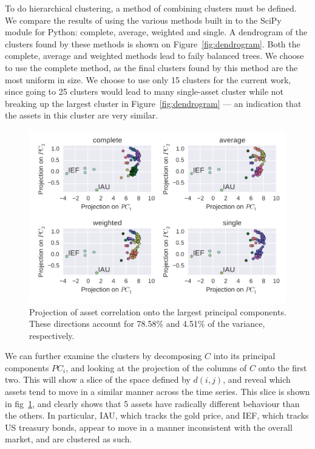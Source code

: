 To do hierarchical clustering, a method of combining clusters must be defined.
We compare the results of using the various methods built in to the SciPy module for Python: complete, average, weighted and single.
A dendrogram of the clusters found by these methods is shown on Figure~\ref{fig:dendrogram}.
Both the complete, average and weighted methods lead to faily balanced trees.
We choose to use the complete method, as the final clusters found by this method are the most uniform in size.
We choose to use only 15 clusters for the current work, since going to 25 clusters would lead to many single-asset cluster while not breaking up the largest cluster in Figure~\ref{fig:dendrogram} --- an indication that the assets in this cluster are very similar.

\begin{figure}[tp]
\centering
\includegraphics{../pic/pca_methods.pdf}
\caption{Projection of asset correlation onto the largest principal components. These directions account for 78.58\% and 4.51\% of the variance, respectively.}
\label{fig:pca}
\end{figure}

We can further examine the clusters by decomposing $C$ into its principal components $PC_i$, and looking at the projection of the columns of $C$ onto the first two.
This will show a slice of the space defined by $d(i,j)$, and reveal which assets tend to move in a similar manner across the time series.
This slice is shown in fig~\ref{fig:pca}, and clearly shows that 5 assets have radically different behaviour than the others.
In particular, IAU, which tracks the gold price, and IEF, which tracks US treasury bonds, appear to move in a manner inconsistent with the overall market, and are clustered as such.


